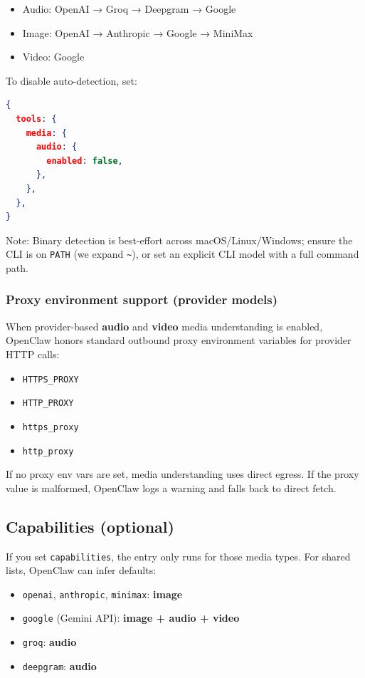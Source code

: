 \begin{itemize}
  \item Audio: OpenAI → Groq → Deepgram → Google
  \item Image: OpenAI → Anthropic → Google → MiniMax
  \item Video: Google
\end{itemize}


To disable auto-detection, set:

\begin{lstlisting}[language=json]
{
  tools: {
    media: {
      audio: {
        enabled: false,
      },
    },
  },
}
\end{lstlisting}


Note: Binary detection is best-effort across macOS/Linux/Windows; ensure the CLI is on \texttt{PATH} (we expand \texttt{\textasciitilde{}}), or set an explicit CLI model with a full command path.

\subsubsection{Proxy environment support (provider models)}


When provider-based \textbf{audio} and \textbf{video} media understanding is enabled, OpenClaw
honors standard outbound proxy environment variables for provider HTTP calls:

\begin{itemize}
  \item \texttt{HTTPS\_PROXY}
  \item \texttt{HTTP\_PROXY}
  \item \texttt{https\_proxy}
  \item \texttt{http\_proxy}
\end{itemize}


If no proxy env vars are set, media understanding uses direct egress.
If the proxy value is malformed, OpenClaw logs a warning and falls back to direct
fetch.

\subsection{Capabilities (optional)}


If you set \texttt{capabilities}, the entry only runs for those media types. For shared
lists, OpenClaw can infer defaults:

\begin{itemize}
  \item \texttt{openai}, \texttt{anthropic}, \texttt{minimax}: \textbf{image}
  \item \texttt{google} (Gemini API): \textbf{image + audio + video}
  \item \texttt{groq}: \textbf{audio}
  \item \texttt{deepgram}: \textbf{audio}
\end{itemize}


